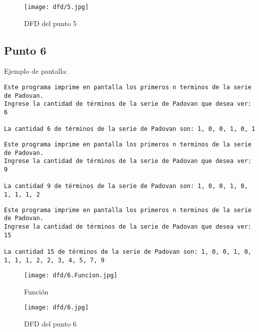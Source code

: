 \begin{figure}
  \centering
  \texttt{[image: dfd/5.jpg]}
  \caption{ DFD del punto 5}
  \label{fig: DFD del punto 5}
\end{figure}






\subsection{Punto 6}
	
	Ejemplo de pantalla:
\begin{lstlisting}
Este programa imprime en pantalla los primeros n terminos de la serie de Padovan.
Ingrese la cantidad de términos de la serie de Padovan que desea ver: 6

La cantidad 6 de términos de la serie de Padovan son: 1, 0, 0, 1, 0, 1
\end{lstlisting}

\begin{lstlisting}
Este programa imprime en pantalla los primeros n terminos de la serie de Padovan.
Ingrese la cantidad de términos de la serie de Padovan que desea ver: 9

La cantidad 9 de términos de la serie de Padovan son: 1, 0, 0, 1, 0, 1, 1, 1, 2
\end{lstlisting}

\begin{lstlisting}
Este programa imprime en pantalla los primeros n terminos de la serie de Padovan.
Ingrese la cantidad de términos de la serie de Padovan que desea ver: 15

La cantidad 15 de términos de la serie de Padovan son: 1, 0, 0, 1, 0, 1, 1, 1, 2, 2, 3, 4, 5, 7, 9
\end{lstlisting}


\begin{figure}
    \centering
    \texttt{[image: dfd/6.Funcion.jpg]}
    \caption{ Función}
    \label{fig: Función}
\end{figure}  
\begin{figure}
  \centering
  \texttt{[image: dfd/6.jpg]}
  \caption{ DFD del punto 6}
  \label{fig: DFD del punto 6}
\end{figure}



